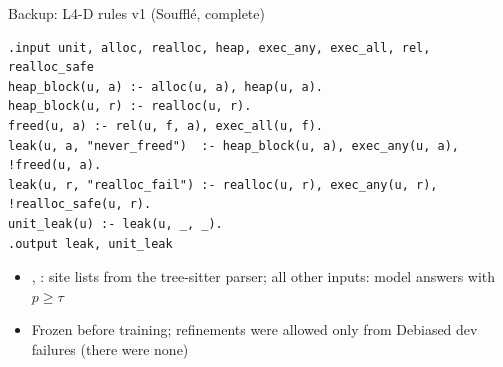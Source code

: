 \begin{frame}[fragile]{Backup: L4-D rules v1 (Souffl\'e, complete)}
\begin{lstlisting}[style=dl]
.input unit, alloc, realloc, heap, exec_any, exec_all, rel, realloc_safe
heap_block(u, a) :- alloc(u, a), heap(u, a).
heap_block(u, r) :- realloc(u, r).
freed(u, a) :- rel(u, f, a), exec_all(u, f).
leak(u, a, "never_freed")  :- heap_block(u, a), exec_any(u, a), !freed(u, a).
leak(u, r, "realloc_fail") :- realloc(u, r), exec_any(u, r), !realloc_safe(u, r).
unit_leak(u) :- leak(u, _, _).
.output leak, unit_leak
\end{lstlisting}
  \vspace{4pt}
  \begin{itemize}\small
    \item {}, : site lists from the tree-sitter parser; all other inputs: model answers with $p \geq \tau$
    \item Frozen before training; refinements were allowed only from Debiased dev failures (there were none)
  \end{itemize}
\end{frame}

